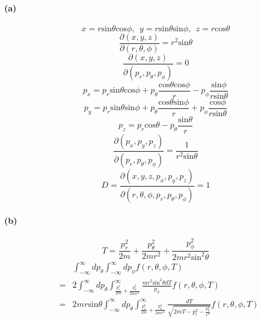 \documentclass{article}
\begin{document}
\paragraph{(a)}
\[x=r \mathrm{sin} \theta \mathrm{cos}\phi, \ \ y= r \mathrm{sin}\theta \mathrm{sin}\phi, \ \ z=r \mathrm{cos}\theta\]
\[\frac{\partial(x,y,z)}{\partial(r,\theta,\phi)}=r^2 \mathrm{sin}\theta \]
\[\frac{\partial(x,y,z)}{\partial(p_r,p_{\theta},p_{\phi})}=0 \]
\[p_x=p_r \mathrm{sin}\theta \mathrm{cos}\phi + p_{\theta} \frac{\mathrm{cos}\theta \mathrm{cos}\phi}{r}-p_{\phi}\frac{\mathrm{sin}\phi}{r \mathrm{sin}\theta}\]
\[p_y=p_r \mathrm{sin}\theta \mathrm{sin}\phi + p_{\theta} \frac{\mathrm{cos} \theta \mathrm{sin}\phi}{r}+p_{\phi}\frac{\mathrm{cos}\phi}{r \mathrm{sin}\theta}\]
\[p_z=p_r \mathrm{cos}\theta - p_{\theta} \frac{\mathrm{sin}\theta}{r}\]
\[\frac{\partial(p_x,p_y,p_z)}{\partial(p_r,p_{\theta},p_{\phi})}=\frac{1}{r^2 \mathrm{sin}\theta} \]
\[D=\frac{\partial(x,y,z,p_x,p_y,p_z)}{\partial(r,\theta,\phi,p_r,p_{\theta},p_{\phi})}=1 \]
\paragraph{(b)}
\[T=\frac{p_r^2}{2m}+\frac{p_{\theta}^2}{2mr^2}+\frac{p_{\phi}^2}{2mr^2 \mathrm{sin}^2\theta}\]
\begin{eqnarray*}
&\ &\int_{-\infty}^{\infty} dp_{\theta} \int_{-\infty}^{\infty} dp_{\phi} f(r,\theta,\phi,T)\\
&=&2\int_{-\infty}^{\infty} dp_{\theta} \int_{\frac{p_r^2}{2m}+\frac{p_{\theta}^2}{2mr^2}}^{\infty} 
\frac{mr^2 \mathrm{sin}^2\theta dT}{p_{\phi}} f(r,\theta,\phi,T) \\
&=&2mr\mathrm{sin}\theta\int_{-\infty}^{\infty} dp_{\theta} \int_{\frac{p_r^2}{2m}+\frac{p_{\theta}^2}{2mr^2}}^{\infty} \frac{dT}{\sqrt{2mT-p_r^2-\frac{p_{\theta}^2}{r^2}}}f(r,\theta,\phi,T)
\end{eqnarray*}
\end{document}
